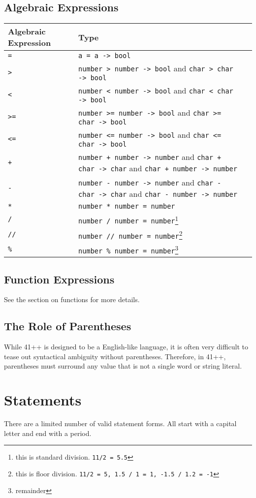 \documentclass{article}
\newcommand{\code}[1]{\texttt{#1}}
\begin{document}
\subsection{Algebraic Expressions}
\begin{tabular}{|l|l|p{8cm}|}
\hline
Algebraic Expression & Type\\
\hline
\code{=} & \code{a = a -> bool}\\
\hline
\code{>} & \code{number > number -> bool} and \code{char > char -> bool}\\
\hline
\code{<} & \code{number < number -> bool} and \code{char < char -> bool}\\
\hline
\code{>=}& \code{number >= number -> bool} and \code{char >= char -> bool}\\
\hline
\code{<=} & \code{number <= number -> bool} and \code{char <= char -> bool}\\
\hline
\code{+}& \code{number + number -> number} and \code{char + char -> char} and \code{char + number -> number}\\
\hline
\code{-} & \code{number - number -> number} and \code{char - char -> char} and \code{char - number -> number}\\
\hline
\code{*} & \code{number * number = number}\\
\hline
\code{/} & \code{number / number = number}\footnote{this is standard division. \code{11/2 = 5.5}}\\
\hline
\code{//} & \code{number // number = number}\footnote{this is floor division. \code{11/2 = 5, 1.5 / 1 = 1, -1.5 / 1.2 = -1}}\\
\code{\%} & \code{number \% number = number}\footnote{remainder}\\
\hline
\end{tabular}
\subsection{Function Expressions}
See the section on functions for more details.
\subsection{The Role of Parentheses}
While 41++ is designed to be a English-like language, it is often very difficult to tease out syntactical ambiguity without parentheses. Therefore, in 41++, parentheses must surround any value that is not a single word or string literal.
\section{Statements}
There are a limited number of valid statement forms. All start with a capital letter and end with a period.
\end{document}
